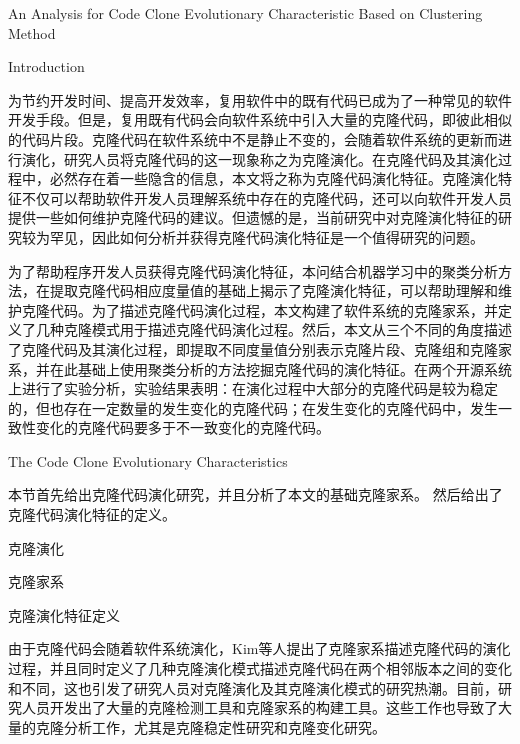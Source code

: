 
{An Analysis for Code Clone Evolutionary Characteristic Based on Clustering Method}

{Introduction}

为节约开发时间、提高开发效率，复用软件中的既有代码已成为了一种常见的软件开发手段。但是，复用既有代码会向软件系统中引入大量的克隆代码，即彼此相似的代码片段。克隆代码在软件系统中不是静止不变的，会随着软件系统的更新而进行演化，研究人员将克隆代码的这一现象称之为克隆演化。在克隆代码及其演化过程中，必然存在着一些隐含的信息，本文将之称为克隆代码演化特征。克隆演化特征不仅可以帮助软件开发人员理解系统中存在的克隆代码，还可以向软件开发人员提供一些如何维护克隆代码的建议。但遗憾的是，当前研究中对克隆演化特征的研究较为罕见，因此如何分析并获得克隆代码演化特征是一个值得研究的问题。

为了帮助程序开发人员获得克隆代码演化特征，本问结合机器学习中的聚类分析方法，在提取克隆代码相应度量值的基础上揭示了克隆演化特征，可以帮助理解和维护克隆代码。为了描述克隆代码演化过程，本文构建了软件系统的克隆家系，并定义了几种克隆模式用于描述克隆代码演化过程。然后，本文从三个不同的角度描述了克隆代码及其演化过程，即提取不同度量值分别表示克隆片段、克隆组和克隆家系，并在此基础上使用聚类分析的方法挖掘克隆代码的演化特征。在两个开源系统上进行了实验分析，实验结果表明：在演化过程中大部分的克隆代码是较为稳定的，但也存在一定数量的发生变化的克隆代码；在发生变化的克隆代码中，发生一致性变化的克隆代码要多于不一致变化的克隆代码。

{The Code Clone Evolutionary Characteristics}


本节首先给出克隆代码演化研究，并且分析了本文的基础克隆家系。
然后给出了克隆代码演化特征的定义。


克隆演化

克隆家系

克隆演化特征定义


由于克隆代码会随着软件系统演化，Kim等人提出了克隆家系描述克隆代码的演化过程，并且同时定义了几种克隆演化模式描述克隆代码在两个相邻版本之间的变化和不同\cite{kim2005empirical}，这也引发了研究人员对克隆演化及其克隆演化模式的研究热潮。目前，研究人员开发出了大量的克隆检测工具和克隆家系的构建工具。这些工作也导致了大量的克隆分析工作，尤其是克隆稳定性研究和克隆变化研究\cite{inoue2012experience}\cite{krinke2008cloned}。

